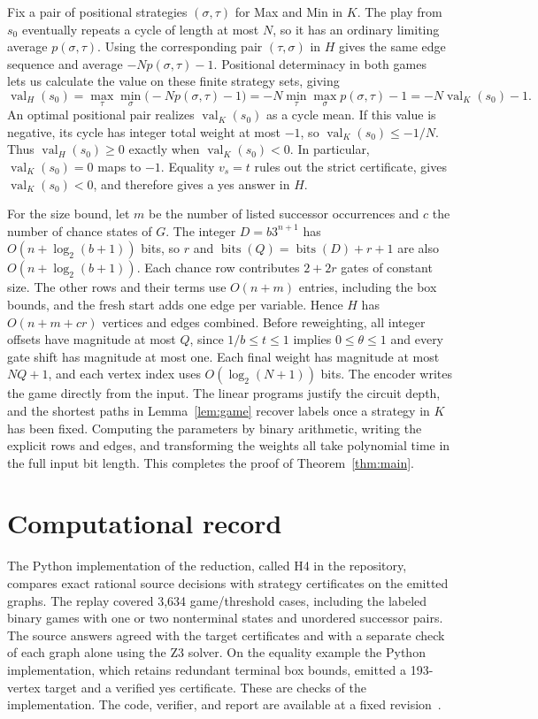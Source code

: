 \documentclass[11pt,letterpaper]{article}
\newcommand{\val}{\operatorname{val}}
\newcommand{\bits}{\operatorname{bits}}
\begin{document}
Fix a pair of positional strategies \((\sigma,\tau)\) for Max and Min in \(K\).
The play from \(s_0\) eventually repeats a cycle of length at most \(N\), so it has
an ordinary limiting average \(p(\sigma,\tau)\). Using the corresponding pair
\((\tau,\sigma)\) in \(H\) gives the same edge sequence and average
\(-Np(\sigma,\tau)-1\). Positional determinacy in both games~\cite{em,gkk} lets
us calculate the value on these finite strategy sets, giving
\[
 \val_H(s_0)=\max_{\tau}\min_{\sigma}\bigl(-Np(\sigma,\tau)-1\bigr)
            =-N\min_{\tau}\max_{\sigma}p(\sigma,\tau)-1
            =-N\val_K(s_0)-1 .
\]
An optimal positional pair realizes \(\val_K(s_0)\) as a cycle mean. If this value
is negative, its cycle has integer total weight at most \(-1\), so
\(\val_K(s_0)\le -1/N\). Thus \(\val_H(s_0)\ge0\) exactly when
\(\val_K(s_0)<0\). In particular, \(\val_K(s_0)=0\) maps to \(-1\).
Equality \(v_s=t\) rules out the strict certificate, gives \(\val_K(s_0)<0\),
and therefore gives a yes answer in \(H\).

For the size bound, let \(m\) be the number of listed successor occurrences
and \(c\) the number of chance states of \(G\). The integer \(D=b3^{n+1}\)
has \(O(n+\log_2(b+1))\) bits, so \(r\) and \(\bits(Q)=\bits(D)+r+1\) are
also \(O(n+\log_2(b+1))\). Each chance row contributes \(2+2r\) gates of
constant size. The other rows and their terms use \(O(n+m)\) entries, including
the box bounds, and the fresh start adds one edge per variable. Hence \(H\) has
\(O(n+m+cr)\) vertices and edges combined. Before reweighting, all integer
offsets have magnitude at most \(Q\), since \(1/b\le t\le1\) implies
\(0\le\theta\le1\) and every gate shift has magnitude at most one. Each final
weight has magnitude at most \(NQ+1\), and each vertex index uses
\(O(\log_2(N+1))\) bits. The encoder writes the game directly from the
input. The linear programs justify the circuit depth, and the shortest paths in
Lemma~\ref{lem:game} recover labels once a strategy in \(K\) has been fixed.
Computing the parameters by binary arithmetic, writing
the explicit rows and edges, and transforming the weights all take polynomial
time in the full input bit length. This completes the proof of
Theorem~\ref{thm:main}.

\section*{Computational record}

The Python implementation of the reduction, called H4 in the repository, compares
exact rational source decisions with strategy certificates on the emitted graphs.
The replay covered 3,634 game/threshold cases, including the labeled binary games
with one or two nonterminal states and unordered successor pairs. The source answers
agreed with the target certificates and with a separate check of each graph alone
using the Z3 solver. On the equality example the Python implementation,
which retains redundant terminal box bounds, emitted a 193-vertex target and a
verified yes certificate. These are checks of the implementation.
The code, verifier, and report are available at a fixed revision~\cite{artifact}.
\end{document}
